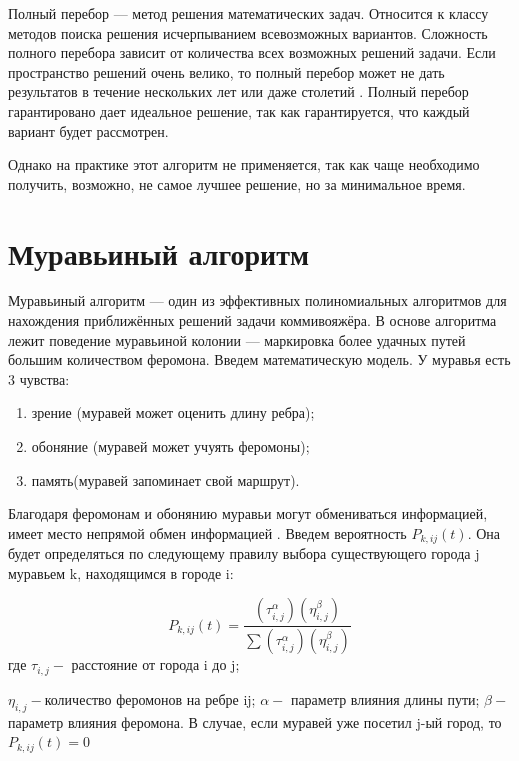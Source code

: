 \documentclass[a4paper,12pt]{report}
\begin{document}
   			Полный перебор — метод решения математических задач. 
   			Относится к классу методов поиска решения исчерпыванием всевозможных вариантов. 
   			Сложность полного перебора зависит от количества всех возможных решений задачи. 
   			Если пространство решений очень велико, то полный перебор может не дать результатов в течение нескольких лет или даже столетий \cite{commi}. 
   			Полный перебор гарантировано дает идеальное решение, так как гарантируется, что каждый вариант будет рассмотрен.
   			
   			Однако на практике этот  алгоритм не применяется, так как чаще необходимо получить, возможно, не самое лучшее решение, но за минимальное время.

	\section{Муравьиный алгоритм}

   			Муравьиный алгоритм — один из эффективных полиномиальных алгоритмов для нахождения приближённых решений задачи коммивояжёра. 
   			В основе алгоритма лежит поведение муравьиной колонии — маркировка более удачных путей большим количеством феромона\cite{ant1}.
   			\newline
   			Введем математическую модель.
   			У муравья есть 3 чувства:
   			
   			\begin{enumerate}
   				\item зрение (муравей может оценить длину ребра);
   				\item обоняние (муравей может учуять феромоны);
   				\item память(муравей запоминает свой маршрут).
   			\end{enumerate}
   		
   			Благодаря феромонам и обонянию муравьи могут обмениваться информацией, имеет место непрямой обмен информацией \cite{shtovba}.
   			Введем вероятность $P_{k, ij}(t)$.
   			Она будет определяться по следующему правилу выбора существующего города j муравьем k, находящимся в городе i:
   			
   			\begin{equation}
   				P_{k, ij}(t)=
   				{\frac {(\tau _{i,j}^{\alpha })(\eta _{i,j}^{\beta })}{\sum (\tau _{i,j}^{\alpha })(\eta _{i,j}^{\beta })}}
   			\end{equation}
   			где \quad$ \tau _{i,j} - $ расстояние от города i до j;
   			
   			$\eta _{i,j} - $количество феромонов на ребре ij;
   			$\alpha - $ параметр влияния длины пути;
   			$\beta - $ параметр влияния феромона.
   			В случае, если муравей уже посетил j-ый город, то $P_{k, ij}(t) = 0$
   			
\end{document}
